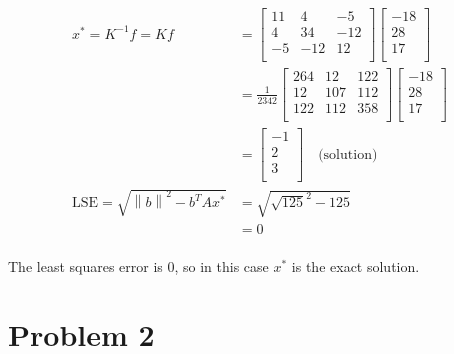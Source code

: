 \documentclass[10pt,letter]{article}
\newcommand\norm[1]{\left\lVert#1\right\rVert}
\begin{document}
\begin{align*}
x^* = K^{-1} f = K f &=
\left[ {\begin{array}{ccc}
 11 & 4  & -5 \\
 4 & 34  & -12 \\
 -5 & -12  & 12 \\
\end{array} } \right]
\left[ {\begin{array}{c}
 -18 \\
 28 \\
 17 \\
\end{array} } \right]
\\ &= \frac{1}{2342}
\left[ {\begin{array}{ccc}
 264 & 12 & 122 \\
 12 & 107 & 112 \\
 122 & 112  & 358 \\
\end{array} } \right]
\left[ {\begin{array}{c}
 -18 \\
 28 \\
 17 \\
\end{array} } \right]
\\ &=
\left[ {\begin{array}{c}
 -1 \\
 2 \\
 3 \\
\end{array} } \right]
\quad \textrm{(solution)}
\\ \textrm{LSE} = \sqrt{\norm{b}^2 - b^T A x^*} &= \sqrt{\sqrt{125}^2 - 125}
\\ &= 0\\
\end{align*}

The least squares error is $0$, so in this case $x^*$ is the exact solution.

\section*{Problem 2}
\end{document}
